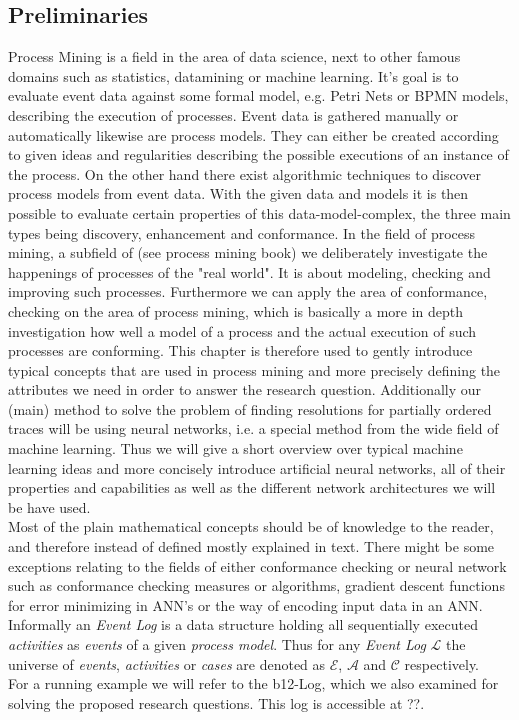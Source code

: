 \documentclass[
	a4paper,
	pagesize,
	pdftex,
	12pt,
	ngerman,
	fleqn,
	final,
	]{scrartcl}
\theoremstyle{plain}
\theoremstyle{definition}
\begin{document}
	\subsection{Preliminaries}
		Process Mining is a field in the area of data science, next to other famous domains such as statistics, datamining or machine learning. \cite[p.3ff]{AalstWilvander2016Pm:d} It's goal is to evaluate event data against some formal model, e.g. Petri Nets or BPMN models, describing the execution of processes. Event data is gathered manually or automatically likewise are process models. They can either be created according to given ideas and regularities describing the possible executions of an instance of the process. On the other hand there exist algorithmic techniques to discover process models from event data. With the given data and models it is then possible to evaluate certain properties of this data-model-complex, the three main types being discovery, enhancement and conformance. 
		In the field of process mining, a subfield of (see process mining book) we deliberately investigate the happenings of processes of the "real world". 
		It is about modeling, checking and improving such processes. Furthermore we can apply the area of conformance, checking on the area of process mining, which is basically a more in depth investigation how well a model of a process and the actual execution of such processes are conforming. This chapter is therefore used to gently introduce typical concepts that are used in process mining and more precisely defining the attributes we need in order to answer the research question. Additionally our (main) method to solve the problem of finding resolutions for partially ordered traces will be using neural networks, i.e. a special method from the wide field of machine learning. Thus we will give a short overview over typical machine learning ideas and more concisely introduce artificial neural networks, all of their properties and capabilities as well as the different network architectures we will be have used. \\
		Most of the plain mathematical concepts should be of knowledge to the reader, and therefore instead of defined mostly explained in text. There might be some exceptions relating to the fields of either conformance checking or neural network such as conformance checking measures or algorithms, gradient descent functions for error minimizing in ANN's or the way of encoding input data in an ANN.\\
		Informally an \textit{Event Log} is a data structure holding all sequentially executed \textit{activities} as \textit{events} of a given \textit{process model}. Thus for any \textit{Event Log} \(\mathcal{L}\) the universe of \textit{events}, \textit{activities} or \textit{cases} are denoted as \(\mathcal{E}\), \(\mathcal{A}\) and \(\mathcal{C}\) respectively. \\
		For a running example we will refer to the b12-Log, which we also examined for solving the proposed research questions. This log is accessible at ??.
		
\end{document}
